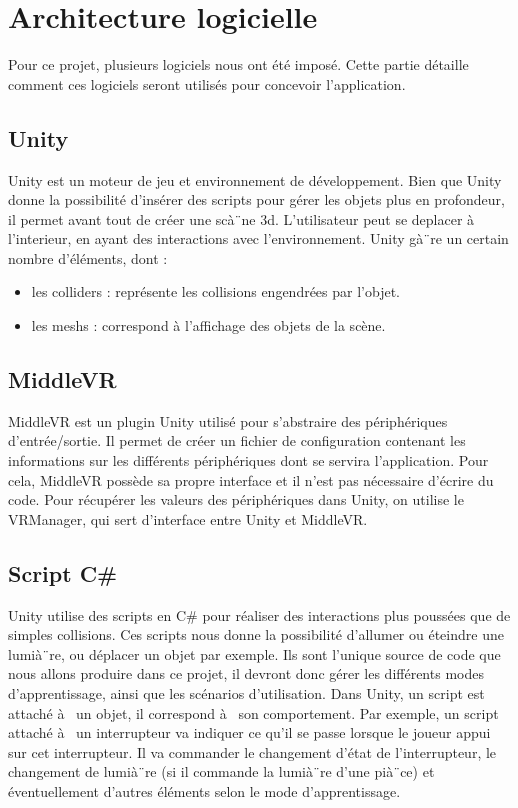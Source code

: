 \section{Architecture logicielle}
Pour ce projet, plusieurs logiciels nous ont été imposé. Cette partie détaille comment ces logiciels seront utilisés pour concevoir l'application.

\subsection{Unity}
Unity est un moteur de jeu et environnement de développement. Bien que Unity donne la possibilité d'insérer des scripts pour gérer les objets plus en profondeur, il permet avant tout de créer une scà¨ne 3d. L'utilisateur peut se deplacer à  l'interieur, en ayant des interactions avec l'environnement. Unity gà¨re un certain nombre d'éléments, dont :
\begin{itemize}
        \item les colliders : représente les collisions engendrées par l'objet.
        \item les meshs : correspond à l'affichage des objets de la scène.
\end{itemize}


\subsection{MiddleVR}
MiddleVR est un plugin Unity utilisé pour s'abstraire des périphériques d'entrée/sortie. Il permet de créer un fichier de configuration contenant les informations sur les différents périphériques dont se servira l'application. Pour cela, MiddleVR possède sa propre interface et il n'est pas nécessaire d'écrire du code.
Pour récupérer les valeurs des périphériques dans Unity, on utilise le VRManager, qui sert d'interface entre Unity et MiddleVR.

\subsection{Script C\#}
Unity utilise des scripts en C\# pour réaliser des interactions plus poussées que de simples collisions. Ces scripts nous donne la possibilité d'allumer ou éteindre une lumià¨re, ou déplacer un objet par exemple. Ils sont l'unique source de code que nous allons produire dans ce projet, il devront donc gérer les différents modes d'apprentissage, ainsi que les scénarios d'utilisation.
Dans Unity, un script est attaché à  un objet, il correspond à  son comportement. Par exemple, un script attaché à  un interrupteur va indiquer ce qu'il se passe lorsque le joueur appui sur cet interrupteur. Il va commander le changement d'état de l'interrupteur, le changement de lumià¨re (si il commande la lumià¨re d'une pià¨ce) et éventuellement d'autres éléments selon le mode d'apprentissage.
